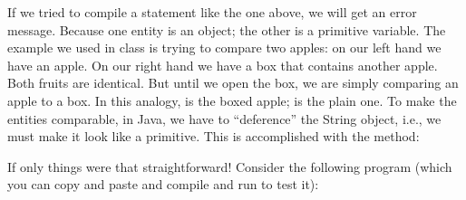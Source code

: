 \documentclass[letterpaper,10pt,english]{sphinxmanual}
\begin{document}
If we tried to compile a statement like the one above, we will get an error message. Because one entity is an object; the other is a primitive variable. The example we used in class is trying to compare two apples: on our left hand we have an apple. On our right hand we have a box that contains another apple. Both fruits are identical. But until we open the box, we are simply comparing an apple to a box. In this analogy,  is the boxed apple;  is the plain one. To make the entities comparable, in Java, we have to “deference” the String object, i.e., we must make it look like a primitive. This is accomplished with the  method:

\begin{sphinxVerbatim}[commandchars=\\\{\}]
    
\end{sphinxVerbatim}

If only things were that straightforward! Consider the following program (which you can copy and paste and compile and run to test it):
\end{document}
